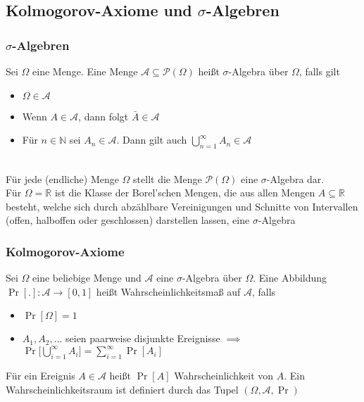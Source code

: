 \documentclass[a4paper,9pt]{extarticle}
\begin{document}
\subsection*{Kolmogorov-Axiome und $\sigma$-Algebren}

\subsubsection*{$\sigma$-Algebren}
Sei $\Omega$ eine Menge. Eine Menge $\mathcal{A} \subseteq \mathcal{P}(\Omega)$ heißt $\sigma$-Algebra über $\Omega$, falls gilt
\begin{itemize}
	\item $\Omega \in \mathcal{A}$
	\item Wenn $A \in \mathcal{A}$, dann folgt $\bar{A} \in \mathcal{A}$
	\item Für $n \in \mathbb{N}$ sei $A_n \in \mathcal{A}$. Dann gilt auch $\bigcup_{n = 1}^∞ A_n \in \mathcal{A}$
\end{itemize} 
~ \\
Für jede (endliche) Menge $\Omega$ stellt die Menge $\mathcal{P}(\Omega)$ eine $\sigma$-Algebra dar. \\

Für $\Omega = \mathbb{R}$ ist die Klasse der Borel'schen Mengen, die aus allen Mengen $A \subseteq \mathbb{R}$ besteht, welche sich durch abzählbare Vereinigungen und Schnitte von Intervallen (offen, halboffen oder geschlossen) darstellen lassen, eine $\sigma$-Algebra

\subsubsection*{Kolmogorov-Axiome}
Sei $\Omega$ eine beliebige Menge und $\mathcal{A}$ eine $\sigma$-Algebra über $\Omega$. Eine Abbildung $\Pr[.] : \mathcal{A} → [0,1]$ heißt Wahrscheinlichkeitsmaß auf $\mathcal{A}$, falls
\begin{itemize}
	\item $\Pr[\Omega] = 1$
	\item $A_1, A_2, \dots$ seien paarweise disjunkte Ereignisse $\implies$ \\
		$\Pr\Bigg[\bigcup_{i=1}^∞ A_i\Bigg] = \sum_{i=1}^∞ \Pr[A_i]$
\end{itemize}

Für ein Ereignis $A \in \mathcal{A}$ heißt $\Pr[A]$ Wahrscheinlichkeit von $A$. Ein Wahrscheinlichkeitsraum ist definiert durch das Tupel $(\Omega, \mathcal{A}, \Pr)$ \\
\end{document}

